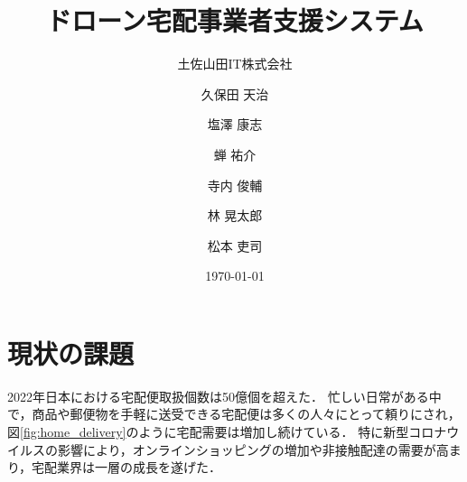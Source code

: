 \documentclass[a4paper, titlepage]{jsarticle}
\date{\today}
\title{ドローン宅配事業者支援システム}
\author{土佐山田IT株式会社 \and
  久保田 天治 \and 塩澤 康志 \and 蝉 祐介 \and 寺内 俊輔 \and 林 晃太郎 \and 松本 吏司}
\begin{document}
\maketitle

\tableofcontents

\clearpage

\section{現状の課題}
2022年日本における宅配便取扱個数は50億個を超えた．
忙しい日常がある中で，商品や郵便物を手軽に送受できる宅配便は多くの人々にとって頼りにされ，図\ref{fig:home_delivery}のように宅配需要は増加し続けている．
特に新型コロナウイルスの影響により，オンラインショッピングの増加や非接触配達の需要が高まり，宅配業界は一層の成長を遂げた．
\end{document}
